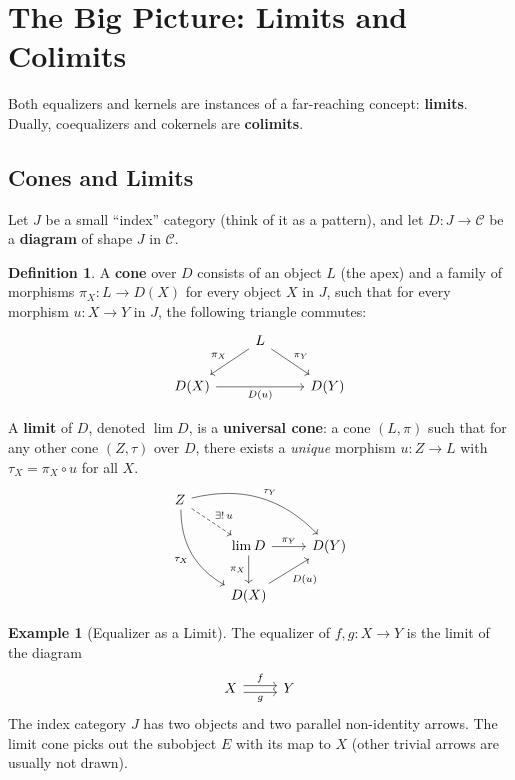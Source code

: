 \documentclass{article}
\theoremstyle{definition}
\newtheorem{definition}{Definition}[section]
\newtheorem{example}{Example}[section]
\begin{document}
\section{The Big Picture: Limits and Colimits}
Both equalizers and kernels are instances of a far-reaching concept: \textbf{limits}. Dually, coequalizers and cokernels are \textbf{colimits}.

\subsection{Cones and Limits}
Let $J$ be a small ``index'' category (think of it as a pattern), and let $D : J \to \mathcal{C}$ be a \textbf{diagram} of shape $J$ in $\mathcal{C}$.

\begin{definition}
A \textbf{cone} over $D$ consists of an object $L$ (the apex) and a family of morphisms $\pi_X : L \to D(X)$ for every object $X$ in $J$, such that for every morphism $u : X \to Y$ in $J$, the following triangle commutes:
\[
\begin{tikzcd}
& L \arrow[dl, "\pi_X"'] \arrow[dr, "\pi_Y"] & \\
D(X) \arrow[rr, "D(u)"'] & & D(Y)
\end{tikzcd}
\]
\end{definition}

A \textbf{limit} of $D$, denoted $\lim D$, is a \textbf{universal cone}: a cone $(L, \pi)$ such that for any other cone $(Z, \tau)$ over $D$, there exists a \emph{unique} morphism $u : Z \to L$ with $\tau_X = \pi_X \circ u$ for all $X$.
\[
\begin{tikzcd}
Z \arrow[drr, bend left, "\tau_Y"] \arrow[ddr, bend right, "\tau_X"'] \arrow[dr, dashed, "\exists!\, u"] & & \\
& \lim D \arrow[r, "\pi_Y"] \arrow[d, "\pi_X"'] & D(Y) \\
& D(X) \arrow[ur, "D(u)"'] &
\end{tikzcd}
\]

\begin{example}[Equalizer as a Limit]
The equalizer of $f, g : X \to Y$ is the limit of the diagram
\[
\begin{tikzcd}
X \arrow[r, shift left, "f"] \arrow[r, shift right, "g"'] & Y
\end{tikzcd}
\]
The index category $J$ has two objects and two parallel non-identity arrows. The limit cone picks out the subobject $E$ with its map to $X$ (other trivial arrows are usually not drawn).
\end{example}
\end{document}
